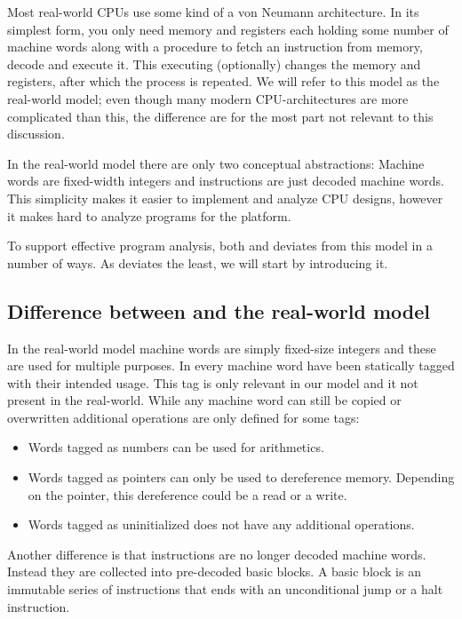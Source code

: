 Most real-world CPUs use some kind of a von Neumann architecture. In its
simplest form, you only need memory and registers each holding some number of
machine words along with a procedure to fetch an instruction from memory, decode
and execute it. This executing (optionally) changes the memory and registers,
after which the process is repeated. We will refer to this model as the
real-world model; even though many modern CPU-architectures are more complicated
than this, the difference are for the most part not relevant to this discussion.

In the real-world model there are only two conceptual abstractions: Machine
words are fixed-width integers and instructions are just decoded machine
words. This simplicity makes it easier to implement and analyze CPU designs,
however it makes hard to analyze programs for the platform.

To support effective program analysis, both \ATAL and \ATALe deviates from this
model in a number of ways. As \ATALe deviates the least, we will start by
introducing it.

\subsection{Difference between \ATALe and the real-world model}

In the real-world model machine words are simply fixed-size integers and these
are used for multiple purposes. In \ATALe every machine word have been
statically tagged with their intended usage. This tag is only relevant in our
model and it not present in the real-world. While any machine word can still be
copied or overwritten additional operations are only defined for some tags:

\begin{itemize}
\item Words tagged as numbers can be used for arithmetics.
\item Words tagged as pointers can only be used to dereference memory. Depending
  on the pointer, this dereference could be a read or a write.
\item Words tagged as uninitialized does not have any additional operations.
\end{itemize}

Another difference is that instructions are no longer decoded machine
words. Instead they are collected into pre-decoded basic blocks. A basic block
is an immutable series of instructions that ends with an unconditional jump or a
halt instruction.

